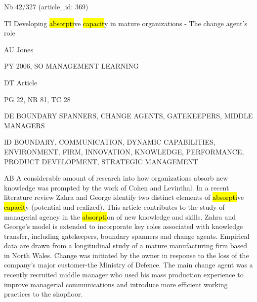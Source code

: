 \documentclass[a4paper]{article}
\begin{document}
\vspace*{-2cm}
Nb \tabto{0cm}42/327 (article\_id: 369)\par
TI \tabto{0cm}Developing \hl{absorpti}ve \hl{capacit}y in mature organizations - The change agent's role\par
AU \tabto{0cm}Jones\par
PY \tabto{0cm}2006, SO MANAGEMENT LEARNING\par
DT \tabto{0cm}Article\par
PG \tabto{0cm}22, NR 81, TC 28\par
DE \tabto{0cm}BOUNDARY SPANNERS, CHANGE AGENTS, GATEKEEPERS, MIDDLE MANAGERS\par
ID \tabto{0cm}BOUNDARY, COMMUNICATION, DYNAMIC CAPABILITIES, ENVIRONMENT, FIRM, INNOVATION, KNOWLEDGE, PERFORMANCE, PRODUCT DEVELOPMENT, STRATEGIC MANAGEMENT\par
AB \tabto{0cm}A considerable amount of research into how organizations absorb new knowledge was prompted by the work of Cohen and Levinthal. In a recent literature review Zahra and George identify two distinct elements of \hl{absorpti}ve \hl{capacit}y (potential and realized). This article contributes to the study of managerial agency in the \hl{absorpti}on of new knowledge and skills. Zahra and George's model is extended to incorporate key roles associated with knowledge transfer, including gatekeepers, boundary spanners and change agents. Empirical data are drawn from a longitudinal study of a mature manufacturing firm based in North Wales. Change was initiated by the owner in response to the loss of the company's major customer-the Ministry of Defence. The main change agent was a recently recruited middle manager who used his mass production experience to improve managerial communications and introduce more efficient working practices to the shopfloor.\par
\clearpage
\end{document}
